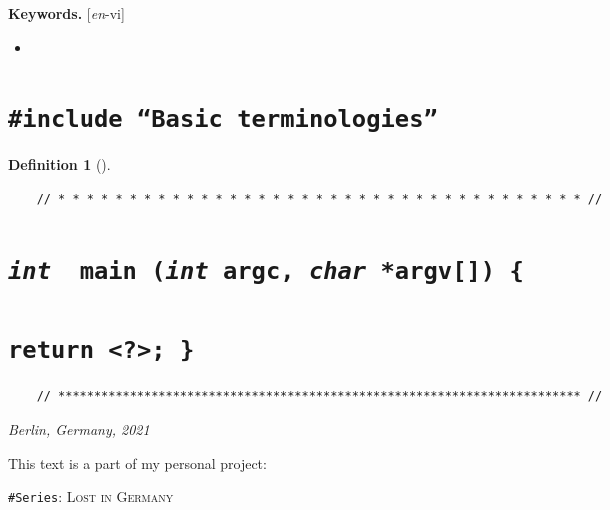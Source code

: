 \documentclass[12pt]{article}
\title{}
\author{Nguyễn Quản Bá Hồng}
\date{\small\textsf{Version: \today}}
\numberwithin{equation}{section}
\newtheorem{definition}{Definition}[section]
\begin{document}
\maketitle
\setcounter{secnumdepth}{6}
\setcounter{tocdepth}{6}


\begin{abstract}
    
\end{abstract}

\noindent
\textbf{Keywords.} [\textit{en}-vi]
\begin{itemize}
    \setlength\itemsep{0em}
    \item 
\end{itemize}

\tableofcontents

\section{\texttt{{\color{RubineRed}\#include} ``Basic terminologies''}}

\begin{definition}[]
    
\end{definition}

\begin{verbatim}
    // * * * * * * * * * * * * * * * * * * * * * * * * * * * * * * * * * * * * * //
\end{verbatim}

\section{\texttt{{\color{cyan}\textit{int}} {\color{YellowGreen} main} ({\color{cyan}\textit{int}} argc, {\color{cyan}\textit{char}} *argv[]) \{}}

\section{\texttt{{\color{RubineRed}return} {\color{Purple}<?>}; \}}}


\begin{verbatim}
    // ************************************************************************* //
\end{verbatim}

\begin{flushright}
    \textit{Berlin, Germany, 2021}
    
    This text is a part of my personal project: 
    
    \texttt{\#Series}: \textsc{Lost in Germany}
\end{flushright}


\begin{thebibliography}{99}
    \bibitem[]{} 
    
    \bibitem[]{} 
\end{thebibliography}
\end{document}
